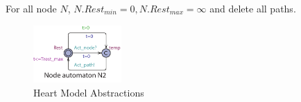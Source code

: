 For all node $N$, $N.Rest_{min}=0,N.Rest_{max}=\infty$ and delete all paths.
\begin{figure}[!h]
		\centering
		\includegraphics[width=0.3\textwidth]{figs/rule6.pdf}
		\caption{\small Heart Model Abstractions}
		\label{fig:rule6}
\end{figure}

